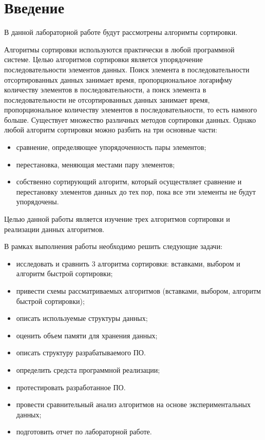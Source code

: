 \chapter*{Введение}

В данной лабораторной работе будут рассмотрены алгоримты сортировки.

Алгоритмы сортировки используются практически в любой программной системе. Целью алгоритмов сортировки является упорядочение последовательности элементов данных. Поиск элемента в последовательности отсортированных данных занимает время, пропорциональное логарифму количеству элементов в последовательности, а поиск элемента в последовательности не отсортированных данных занимает время, пропорциональное количеству элементов в последовательности, то есть намного больше. Существует множество различных методов сортировки данных. Однако любой алгоритм сортировки можно разбить на три основные части:
\begin{itemize}
    \item сравнение, определяющее упорядоченность пары элементов;
    \item перестановка, меняющая местами пару элементов;
    \item собственно сортирующий алгоритм, который осуществляет сравнение и перестановку элементов данных до тех пор, пока все эти элементы не будут упорядочены.
\end{itemize}

Целью данной работы является изучение трех алгоритмов сортировки и реализации данных алгоритмов.

В рамках выполнения работы необходимо решить следующие задачи:
\begin{itemize}
	\item исследовать и сравнить 3 алгоритма сортировки: вставками, выбором и алгоритм быстрой сортировки;
	\item привести схемы рассматриваемых алгоритмов (вставками, выбором, алгоритм быстрой сортировки);
	\item описать используемые структуры данных;
	\item оценить объем памяти для хранения данных;
	\item описать структуру разрабатываемого ПО.
	\item определить средста программной реализации;
	\item протестировать разработанное ПО.
	\item провести сравнительный анализ алгоритмов на основе экспериментальных данных;
    \item подготовить отчет по лабораторной работе.
\end{itemize}
